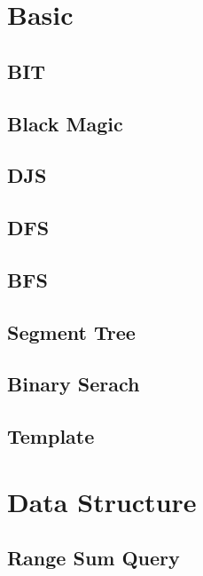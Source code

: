 \section{Basic}
    \subsection{BIT}
        
    \subsection{Black Magic}
        
    \subsection{DJS}
        
    \subsection{DFS}
        
    \subsection{BFS}
        
    \subsection{Segment Tree}
        
    \subsection{Binary Serach}
        
    \subsection{Template}
        

\section{Data Structure}
    \subsection{Range Sum Query}
        

